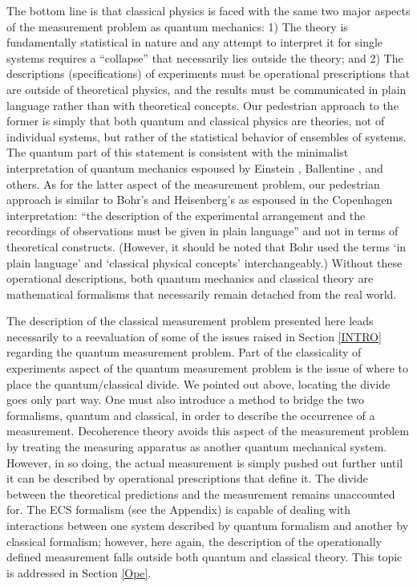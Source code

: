 \documentclass [12pt]{revtex4}
\begin{document}
The bottom line is that classical physics is faced with the same two
major aspects of the measurement problem as quantum mechanics: 1)
The theory is fundamentally statistical in nature and any attempt to
interpret it for single systems requires a ``collapse'' that
necessarily lies outside the
theory; and 2) The descriptions (specifications) of experiments must
be operational prescriptions that are outside of theoretical
physics, and the results must be communicated in plain language
rather than with theoretical concepts. Our pedestrian approach to
the former is simply that both quantum and classical physics are
theories, not of individual systems, but rather of the statistical
behavior of ensembles of systems. The quantum part of this statement
is consistent with the minimalist interpretation of quantum
mechanics espoused by Einstein \cite{E1949}, Ballentine \cite{B1970}, and
others. As for the latter
aspect of the measurement problem, our pedestrian approach is
similar to Bohr's and Heisenberg's as espoused in the Copenhagen
interpretation: ``the description of the experimental arrangement
and the recordings of observations must be given in plain language''
and not in terms of theoretical constructs.  (However, it should be
noted that Bohr used the terms `in plain language' and `classical
physical concepts' interchangeably.)  Without these operational
descriptions, both quantum mechanics and classical theory are
mathematical formalisms that necessarily remain detached from the
real world.

The description of the classical measurement problem presented
here leads necessarily to a reevaluation of some of the issues raised
in Section \ref{INTRO} regarding the quantum measurement problem.
Part of the classicality of experiments aspect of the quantum measurement
problem is the issue of where to place the quantum/classical divide.
We pointed out above, locating the divide goes only part way. One must
also introduce a method to bridge the two formalisms, quantum and classical,
in order to describe the occurrence of a measurement.  Decoherence theory
avoids this aspect of the measurement problem by treating the measuring
apparatus as another quantum mechanical system. However, in so doing,
the actual measurement is simply pushed out further until it can be
described by operational prescriptions that define it. The divide between
the theoretical predictions and the measurement remains unaccounted
for. The ECS formalism (see the Appendix) is capable of dealing
with interactions between one system described by quantum formalism
and another by classical formalism; however, here again, the description
of the operationally defined measurement falls outside both quantum
and classical theory. This topic is addressed in Section \ref{Ope}.
\end{document}
